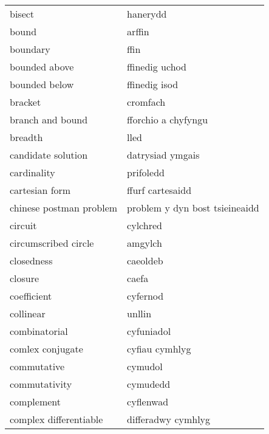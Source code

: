 \begin{supertabular}{p{0.22\textwidth}p{0.22\textwidth}}
                           bisect &                         hanerydd \\
                            bound &                           arffin \\
                         boundary &                             ffin \\
                    bounded above &                   ffinedig uchod \\
                    bounded below &                    ffinedig isod \\
                          bracket &                         cromfach \\
                 branch and bound &              fforchio a chyfyngu \\
                          breadth &                             lled \\
               candidate solution &                 datrysiad ymgais \\
                      cardinality &                        prifoledd \\
                   cartesian form &                 ffurf cartesaidd \\
          chinese postman problem &   problem y dyn bost tsieineaidd \\
                          circuit &                         cylchred \\
             circumscribed circle &                          amgylch \\
                       closedness &                         caeoldeb \\
                          closure &                            caefa \\
                      coefficient &                         cyfernod \\
                        collinear &                           unllin \\
                    combinatorial &                       cyfuniadol \\
                 comlex conjugate &                   cyfiau cymhlyg \\
                      commutative &                          cymudol \\
                    commutativity &                         cymudedd \\
                       complement &                        cyflenwad \\
           complex differentiable &               differadwy cymhlyg \\

\end{supertabular}
